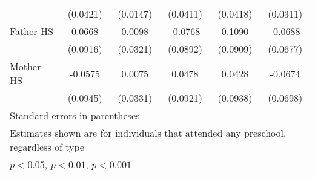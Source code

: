 \begin{table}[htbp]
\begin{tabular}{l*{5}{c}}
            &    (0.0421)         &    (0.0147)         &    (0.0411)         &    (0.0418)         &    (0.0311)         \\
\addlinespace
Father HS   &      0.0668         &      0.0098         &     -0.0768         &      0.1090         &     -0.0688         \\
            &    (0.0916)         &    (0.0321)         &    (0.0892)         &    (0.0909)         &    (0.0677)         \\
\addlinespace
Mother HS   &     -0.0575         &      0.0075         &      0.0478         &      0.0428         &     -0.0674         \\
            &    (0.0945)         &    (0.0331)         &    (0.0921)         &    (0.0938)         &    (0.0698)         \\
\bottomrule
\multicolumn{6}{l}{\footnotesize Standard errors in parentheses}\\
\multicolumn{6}{l}{\footnotesize Estimates shown are for individuals that attended any preschool, regardless of type}\\
\multicolumn{6}{l}{\footnotesize \sym{*} \(p<0.05\), \sym{**} \(p<0.01\), \sym{***} \(p<0.001\)}\\
\end{tabular}
\end{table}
